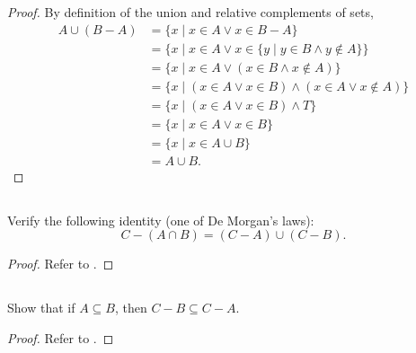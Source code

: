 \documentclass{report}
\begin{document}
\begin{proof}
    By definition of the union and relative complements of sets,
      \begin{align*}
        A \cup (B - A)
          & = \{ x \mid x \in A \lor x \in B - A \} \\
          & = \{ x \mid x \in A \lor
            x \in \{ y \mid y \in B \land y \not\in A \} \} \\
          & = \{ x \mid x \in A \lor (x \in B \land x \not\in A) \} \\
          & = \{ x \mid (x \in A \lor x \in B) \land
            (x \in A \lor x \not\in A) \} \\
          & = \{ x \mid (x \in A \lor x \in B) \land T \} \\
          & = \{ x \mid x \in A \lor x \in B \} \\
          & = \{ x \mid x \in A \cup B \} \\
          & = A \cup B.
      \end{align*}

\end{proof}

\subsection{}%
\label{sub:exercise-2.12}

Verify the following identity (one of De Morgan's laws):
  $$C - (A \cap B) = (C - A) \cup (C - B).$$

\begin{proof}

  Refer to .

\end{proof}

\subsection{}%
\label{sub:exercise-2.13}

Show that if $A \subseteq B$, then $C - B \subseteq C - A$.

\begin{proof}

  Refer to .

\end{proof}

\subsection{}%
\label{sub:exercise-2.14}
\end{document}
